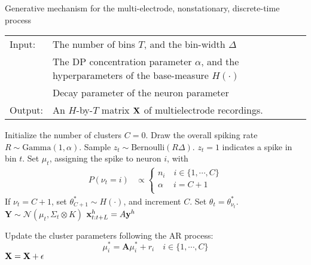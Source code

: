\newcommand{\tx}{\tilde{x}}
\newcommand{\bY}{\mathbf{Y}}

\begin{algorithm}
\caption{Generative mechanism for the multi-electrode, nonstationary, discrete-time process}\label{alg:gen_proc}
\begin{tabular}{p{1.2cm}p{12.4cm}}
Input:&  The number of bins $T$, and the bin-width $\Delta$\\
  & The DP concentration parameter $\alpha$, and the hyperparameters of the base-measure $H(\cdot)$\\ 
 & Decay parameter of the neuron parameter \\
Output:& An $H$-by-$T$ matrix $\mathbf{X}$ of multielectrode recordings. %
\end{tabular}
\begin{algorithmic}[1]
\State Initialize the number of clusters $C = 0$.
\State Draw the overall spiking rate $R \sim \text{Gamma}(1,\alpha)$.
\State Sample $z_t \sim \text{Bernoulli}(R\Delta)$. $z_t = 1$ indicates a spike in bin $t$.
   \label{enum:thin}
  \State Set $\mu_t$, assigning the spike to neuron $i$, with
\begin{align}
  P({\nu_t} = i) & \propto 
  \begin{cases}
   n_i \quad i \in \{1,\cdots, C\} \\
   \alpha \quad\ i = C + 1 \\
  \end{cases}
\end{align}
\State If{ $\nu_t = C + 1$}, set $\theta^*_{C+1} \sim H(\cdot)$, and increment $C$.
\State Set $\theta_t = \theta^*_{\nu_t}$.
\State $\bY \sim \mathcal{N}(\mu_t, \Sigma_t \otimes K)$
\State $\mathbf{x}^h_{t:t+L} = A\mathbf{y}^h$
\EndIf

\State Update the cluster parameters following the AR process: $$\mu^*_i = \mathbf{A} \mu^*_i + r_i \quad i \in \{1, \cdots, C\}$$
\EndFor
\State $\mathbf{X} = \mathbf{X} + \mathbf{\epsilon}$
\end{algorithmic}
\end{algorithm}


